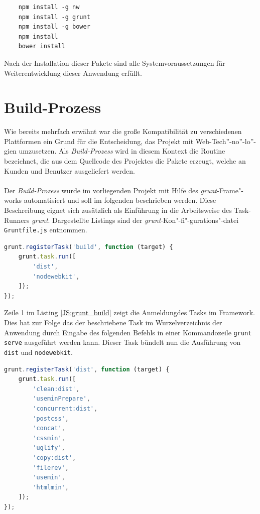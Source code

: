 \begin{lstlisting}
	npm install -g nw
	npm install -g grunt
	npm install -g bower
	npm install
	bower install
\end{lstlisting}

Nach der Installation dieser Pakete sind alle Systemvoraussetzungen für Weiterentwicklung dieser Anwendung erfüllt. 

\section{Build-Prozess}
Wie bereits mehrfach erwähnt war die große Kompatibilität zu verschiedenen Plattformen ein Grund für die Entscheidung, das Projekt mit Web-Tech”-no”-lo”-gien umzusetzen. Als \textit{Build-Prozess} wird in diesem Kontext die Routine bezeichnet, die aus dem Quellcode des Projektes die Pakete erzeugt, welche an Kunden und Benutzer ausgeliefert werden.

\paragraph{}Der \textit{Build-Prozess} wurde im vorliegenden Projekt mit Hilfe des \textit{grunt}-Frame"-works automatisiert und soll im folgenden beschrieben werden. Diese Beschreibung eignet sich zusätzlich als Einführung in die Arbeitsweise des \glqq Task-Runners \grqq \textit{grunt}. Dargestellte Listings sind der \textit{grunt}-Kon"-fi"-gurations"-datei \\\texttt{Gruntfile.js} entnommen.

\begin{lstlisting}[language=JavaScript,label=JS:grunt_build,caption=grunt build-Task]
grunt.registerTask('build', function (target) {
	grunt.task.run([
		'dist',
		'nodewebkit',
	]);
});
\end{lstlisting}

Zeile 1 im Listing \ref{JS:grunt_build} zeigt die \glqq Anmeldung\grqq des Tasks im Framework. Dies hat zur Folge das der beschriebene Task im Wurzelverzeichnis der Anwendung durch Eingabe des folgenden Befehls in einer Kommandozeile \texttt{grunt serve} ausgeführt werden kann. Dieser Task bündelt nun die Ausführung von \texttt{dist} und \texttt{nodewebkit}.

\newpage
\begin{lstlisting}[language=JavaScript,label=JS:grunt_dist,caption=grunt dist-Task]
grunt.registerTask('dist', function (target) {
	grunt.task.run([
		'clean:dist',
		'useminPrepare',
		'concurrent:dist',
		'postcss',
		'concat',
		'cssmin',
		'uglify',
		'copy:dist',
		'filerev',
		'usemin',
		'htmlmin',
	]);
});
\end{lstlisting}

